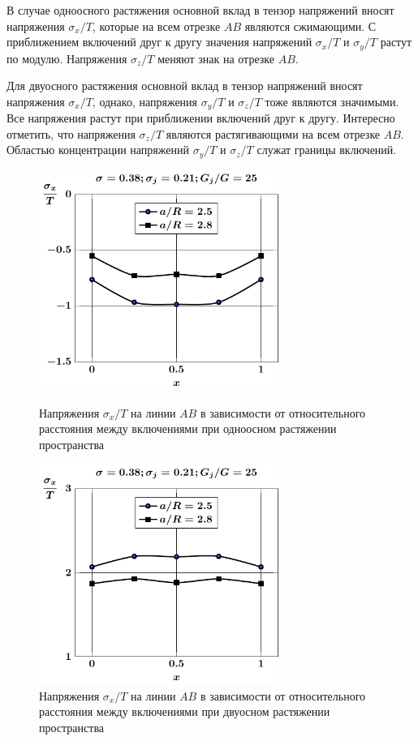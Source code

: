 В случае одноосного растяжения основной вклад в тензор напряжений вносят напряжения $\sigma_x/T$, которые на всем отрезке $AB$ являются сжимающими. С приближением включений друг к другу значения напряжений $\sigma_x/T$ и $\sigma_y/T$ растут по модулю. Напряжения $\sigma_z/T$ меняют знак на отрезке $AB$.

Для двуосного растяжения основной вклад в тензор напряжений вносят напряжения $\sigma_x/T$, однако, напряжения $\sigma_y/T$ и $\sigma_z/T$ тоже являются значимыми. Все напряжения растут при приближении включений друг к другу. Интересно отметить, что напряжения $\sigma_z/T$ являются растягивающими на всем отрезке $AB$. Областью концентрации напряжений $\sigma_y/T$ и $\sigma_z/T$ служат границы включений.

\begin{figure}[h!]
\centering\footnotesize
\parbox[b]{7.5cm}{\centering\includegraphics[width=7.8cm]{inc9-a-d95-g25-t1-sig_x.pdf}
\caption{Напряжения $\sigma_x/T$ на линии  $AB$ в зависимости от относительного расстояния между включениями при одноосном растяжении пространства
\label{f:8:64}}}\hfil\hfil
\parbox[b]{7.5cm}{\centering\includegraphics[width=7.8cm]{inc9-a-d95-g25-t2-sig_x.pdf}
\caption{Напряжения $\sigma_x/T$ на линии  $AB$ в зависимости от относительного расстояния между включениями при двуосном растяжении пространства
\label{f:8:65}}}
\end{figure}

